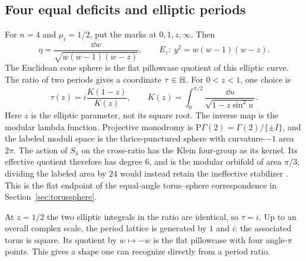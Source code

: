 \subsection{Four equal deficits and elliptic periods}

For $n=4$ and $\mu_i=1/2$, put the marks at $0,1,z,\infty$. Then
\begin{equation}
 \eta=\frac{\dd w}{\sqrt{w(w-1)(w-z)}},\qquad
 E_z:\ y^2=w(w-1)(w-z).
 \label{eq:ellipticDM}
\end{equation}
The Euclidean cone sphere is the flat pillowcase quotient of this
elliptic curve. The ratio of two periods gives a coordinate
$\tau\in\mathbb H$. For $0<z<1$, one choice is
\begin{equation}
 \tau(z)=i\frac{K(1-z)}{K(z)},\qquad
 K(z)=\int_0^{\pi/2}\frac{\dd u}{\sqrt{1-z\sin^2u}}.
 \label{eq:ellipticperiodratio}
\end{equation}
Here $z$ is the elliptic parameter, not its square root. The inverse
map is the modular lambda function. Projective monodromy is
$\mathrm P\Gamma(2)=\Gamma(2)/\{\pm I\}$, and the labeled moduli
space is the thrice-punctured
sphere with curvature-$-1$ area $2\pi$. The action of $S_4$ on the
cross-ratio has the Klein four-group as its kernel. Its effective
quotient therefore has degree $6$, and is the modular orbifold of
area $\pi/3$; dividing the labeled area by $24$ would instead retain
the ineffective stabilizer
\cite[Example 2.1 and Section 5]{Kojima}. This is the flat
endpoint of the equal-angle torus--sphere correspondence in
Section~\ref{sec:torussphere}.

At $z=1/2$ the two elliptic integrals in the ratio are identical,
so $\tau=i$. Up to an overall complex scale, the period lattice
is generated by $1$ and $i$: the associated torus is square.
Its quotient by $w\mapsto-w$ is the flat pillowcase with four
angle-$\pi$ points. This gives a shape one can recognize directly
from a period ratio.

